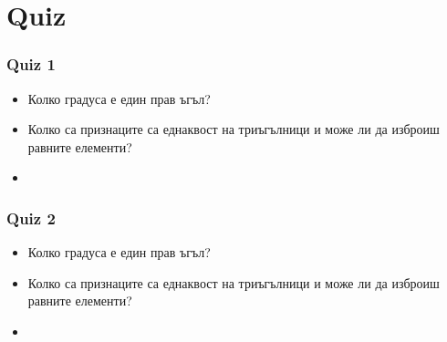 \documentclass{article}
\begin{document}
\newpage
\section{Quiz}

\subsubsection{Quiz 1}
\begin{itemize}
	\item Колко градуса е един прав ъгъл?
	\item Колко са признаците са еднаквост на триъгълници и може ли да изброиш равните елементи?
	\item 
\end{itemize}


\subsubsection{Quiz 2}
\begin{itemize}
	\item Колко градуса е един прав ъгъл?
	\item Колко са признаците са еднаквост на триъгълници и може ли да изброиш равните елементи?
	\item 
\end{itemize}
\end{document}
